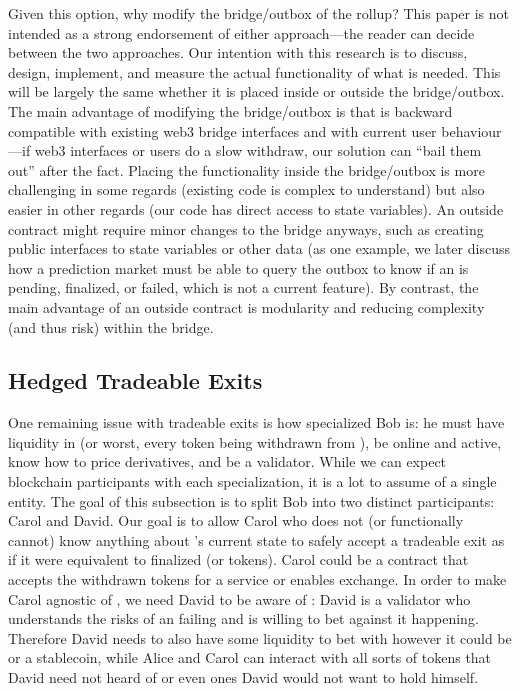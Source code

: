 Given this option, why modify the bridge/outbox of the rollup? This paper is not intended as a strong endorsement of either approach---the reader can decide between the two approaches. Our intention with this research is to discuss, design, implement, and measure the actual functionality of what is needed. This will be largely the same whether it is placed inside or outside the bridge/outbox. The main advantage of modifying the bridge/outbox is that is backward compatible with existing web3 bridge interfaces and with current user behaviour---if web3 interfaces or users do a slow withdraw, our solution can ``bail them out'' after the fact. Placing the functionality inside the bridge/outbox is more challenging in some regards (\eg existing code is complex to understand) but also easier in other regards (\eg our code has direct access to state variables). An outside contract might require minor changes to the bridge anyways, such as creating public interfaces to state variables or other data (\eg as one example, we later discuss how a prediction market must be able to query the outbox to know if an \rblock is pending, finalized, or failed, which is not a current feature). By contrast, the main advantage of an outside contract is modularity and reducing complexity (and thus risk) within the bridge.

\subsection{Hedged Tradeable Exits}
\label{sec:PM}

One remaining issue with tradeable exits is how specialized Bob is: he must have liquidity in \ethone (or worst, every token being withdrawn from \layertwo), be online and active, know how to price derivatives, and be a \layertwo validator. While we can expect blockchain participants with each specialization, it is a lot to assume of a single entity. The goal of this subsection is to split Bob into two distinct participants: Carol and David. Our goal is to allow Carol who does not (or functionally cannot) know anything about \layertwo's current state to safely accept a tradeable exit as if it were equivalent to finalized \ethone (or \layerone tokens). Carol could be a \layerone contract that accepts the withdrawn tokens for a service or enables exchange. In order to make Carol agnostic of \layertwo, we need David to be aware of \layertwo: David is a \layertwo validator who understands the risks of an \rblock failing and is willing to bet against it happening. Therefore David needs to also have some liquidity to bet with however it could be \ethone or a stablecoin, while Alice and Carol can interact with all sorts of tokens that David need not heard of or even ones David would not want to hold himself. 

